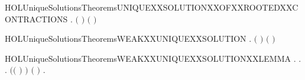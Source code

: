 \newcommand{\HOLUniqueSolutionsTheoremsUNIQUEXXSOLUTIONXXOFXXOBSXXCONTRACTIONSXXLEMMA}{\UseVerbatim{HOLUniqueSolutionsTheoremsUNIQUEXXSOLUTIONXXOFXXOBSXXCONTRACTIONSXXLEMMA}}
\begin{SaveVerbatim}{HOLUniqueSolutionsTheoremsUNIQUEXXSOLUTIONXXOFXXROOTEDXXCONTRACTIONS}
\HOLTokenTurnstile{} \HOLSymConst{\HOLTokenForall{}}  .
         \HOLSymConst{\HOLTokenConj{}}   \ensuremath{(} \ensuremath{)} \HOLSymConst{\HOLTokenConj{}}   \ensuremath{(} \ensuremath{)} \HOLSymConst{\HOLTokenImp{}}
         
\end{SaveVerbatim}
\newcommand{\HOLUniqueSolutionsTheoremsUNIQUEXXSOLUTIONXXOFXXROOTEDXXCONTRACTIONS}{\UseVerbatim{HOLUniqueSolutionsTheoremsUNIQUEXXSOLUTIONXXOFXXROOTEDXXCONTRACTIONS}}
\begin{SaveVerbatim}{HOLUniqueSolutionsTheoremsWEAKXXUNIQUEXXSOLUTION}
\HOLTokenTurnstile{} \HOLSymConst{\HOLTokenForall{}}  .
         \HOLSymConst{\HOLTokenConj{}}   \HOLSymConst{\HOLTokenConj{}}   \ensuremath{(} \ensuremath{)} \HOLSymConst{\HOLTokenConj{}}   \ensuremath{(} \ensuremath{)} \HOLSymConst{\HOLTokenImp{}}
         
\end{SaveVerbatim}
\newcommand{\HOLUniqueSolutionsTheoremsWEAKXXUNIQUEXXSOLUTION}{\UseVerbatim{HOLUniqueSolutionsTheoremsWEAKXXUNIQUEXXSOLUTION}}
\begin{SaveVerbatim}{HOLUniqueSolutionsTheoremsWEAKXXUNIQUEXXSOLUTIONXXLEMMA}
\HOLTokenTurnstile{} \HOLSymConst{\HOLTokenForall{}}.
         \HOLSymConst{\HOLTokenConj{}}   \HOLSymConst{\HOLTokenImp{}}
       \HOLSymConst{\HOLTokenForall{}}  .
             \HOLTokenTransBegin{}\HOLTokenTransEnd {} \HOLSymConst{\HOLTokenImp{}}
           \HOLSymConst{\HOLTokenExists{}}.
                 \HOLSymConst{\HOLTokenConj{}} \ensuremath{(}\ensuremath{(} \HOLSymConst{\ensuremath{=}} \HOLConst{\ensuremath{\tau}}\ensuremath{)} \HOLSymConst{\HOLTokenImp{}}  \ensuremath{)} \HOLSymConst{\HOLTokenConj{}} \ensuremath{(} \HOLSymConst{\ensuremath{=}}  \ensuremath{)} \HOLSymConst{\HOLTokenConj{}}
               \HOLSymConst{\HOLTokenForall{}}.   \HOLTokenTransBegin{}\HOLTokenTransEnd {} 
\end{SaveVerbatim}
